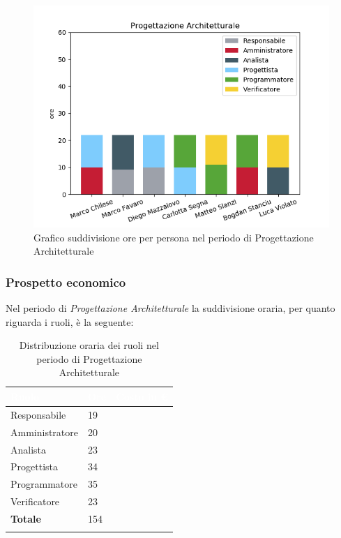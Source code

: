 \begin{figure}[H]
	\centering
  		\includegraphics[width=0.8\linewidth]{./images/fig_pa.png}
  		\caption{Grafico suddivisione ore per persona nel periodo di Progettazione Architetturale}
  		\label{fig:grafico suddivione ruoli periodo di pa}
\end{figure}



\subsubsection{Prospetto economico}
Nel periodo di \textit{Progettazione Architetturale} la suddivisione oraria, per quanto riguarda i ruoli, è la seguente: 


\begin{longtable}{| C{.30\textwidth}| C{.15\textwidth}| C{.20\textwidth}|}
\hline
{}\textbf{\textcolor{white}{Ruolo}} & \textbf{\textcolor{white}{Ore}} & \textbf{\textcolor{white}{Costo in \euro}} \\
\hline 
Responsabile & 19 &  \\
\hline
{}Amministratore & 20 & \\
\hline
Analista & 23 &  \\
\hline
{}Progettista & 34 &  \\
\hline
Programmatore & 35 &  \\
\hline
{}Verificatore & 23 &  \\
\hline
\textbf{Totale} & 154 & \\ 
\hline

\caption{Distribuzione oraria dei ruoli nel periodo di Progettazione Architetturale}
\label{Distribuzione oraria per ruoli del periodo di pa}
\end{longtable}

